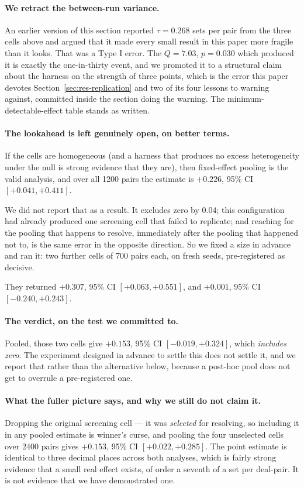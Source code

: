 \documentclass[11pt,letterpaper]{article}
\begin{document}
\paragraph{We retract the between-run variance.} An earlier version of this
section reported $\tau = 0.268$ sets per pair from the three cells above and
argued that it made every small result in this paper more fragile than it looks.
That was a Type I error. The $Q = 7.03$, $p = 0.030$ which produced it is exactly
the one-in-thirty event, and we promoted it to a structural claim about the
harness on the strength of three points, which is the error this paper devotes
Section~\ref{sec:res-replication} and two of its four lessons to warning against,
committed inside the section doing the warning. The minimum-detectable-effect
table stands as written.

\paragraph{The lookahead is left genuinely open, on better terms.} If the
cells are homogeneous (and a harness that produces no excess heterogeneity
under the null is strong evidence that they are), then fixed-effect pooling is
the valid analysis, and over all 1200 pairs the estimate is $+0.226$, 95\% CI
$[+0.041, +0.411]$.

We did not report that as a result. It excludes zero by $0.04$; this
configuration had already produced one screening cell that failed to replicate;
and reaching for the pooling that happens to resolve, immediately after the
pooling that happened not to, is the same error in the opposite direction. So we
fixed a size in advance and ran it: two further cells of 700 pairs each, on fresh
seeds, pre-registered as decisive.

They returned $+0.307$, 95\% CI $[+0.063, +0.551]$, and $+0.001$, 95\% CI
$[-0.240, +0.243]$.

\paragraph{The verdict, on the test we committed to.} Pooled, those two cells
give $+0.153$, 95\% CI $[-0.019, +0.324]$, which \emph{includes zero}. The
experiment designed in advance to settle this does not settle it, and we report
that rather than the alternative below, because a post-hoc pool does not get to
overrule a pre-registered one.

\paragraph{What the fuller picture says, and why we still do not claim it.}
Dropping the original screening cell --- it was \emph{selected} for resolving, so
including it in any pooled estimate is winner's curse, and pooling the four
unselected cells over 2400 pairs gives $+0.153$, 95\% CI $[+0.022, +0.285]$. The
point estimate is identical to three decimal places across both analyses, which
is fairly strong evidence that a small real effect exists, of order a seventh of
a set per deal-pair. It is not evidence that we have demonstrated one.
\end{document}
